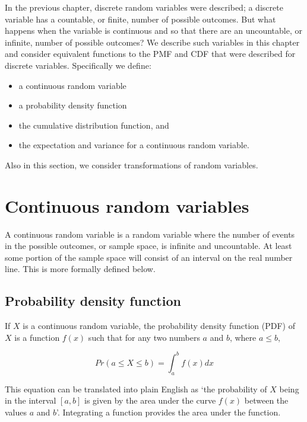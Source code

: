 \documentclass[
  oneside]{krantz}
\begin{document}
In the previous chapter, discrete random variables were described; a discrete variable has a countable, or finite, number of possible outcomes. But what happens when the variable is continuous and so that there are an uncountable, or infinite, number of possible outcomes? We describe such variables in this chapter and consider equivalent functions to the PMF and CDF that were described for discrete variables. Specifically we define:

\begin{itemize}
\item
  a continuous random variable
\item
  a probability density function
\item
  the cumulative distribution function, and
\item
  the expectation and variance for a continuous random variable.
\end{itemize}

Also in this section, we consider transformations of random variables.

\hypertarget{continuous-random-variables}{%
\section{Continuous random variables}\label{continuous-random-variables}}

A continuous random variable is a random variable where the number of events in the possible outcomes, or sample space, is infinite and uncountable. At least some portion of the sample space will consist of an interval on the real number line. This is more formally defined below.

\hypertarget{probability-density-function}{%
\subsection{Probability density function}\label{probability-density-function}}

If \(X\) is a continuous random variable, the probability density function (PDF) of \(X\) is a function \(f(x)\) such that for any two numbers \(a\) and \(b\), where \(a \leq b\),

\begin{equation}
\label{contrvpdf}
Pr(a \le X \le b) = \int_a^b f(x)dx
\end{equation}

This equation can be translated into plain English as `the probability of \(X\) being in the interval \([a, b]\) is given by the area under the curve \(f(x)\) between the values \(a\) and \(b\)'. Integrating a function provides the area under the function.
\end{document}
